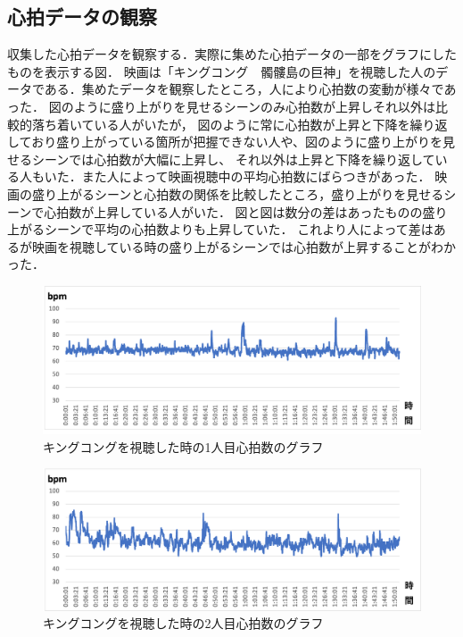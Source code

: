 \subsection{心拍データの観察}

収集した心拍データを観察する．実際に集めた心拍データの一部をグラフにしたものを表示する図．
映画は「キングコング　髑髏島の巨神」を視聴した人のデータである．集めたデータを観察したところ，人により心拍数の変動が様々であった．
図のように盛り上がりを見せるシーンのみ心拍数が上昇しそれ以外は比較的落ち着いている人がいたが，
図のように常に心拍数が上昇と下降を繰り返しており盛り上がっている箇所が把握できない人や、図のように盛り上がりを見せるシーンでは心拍数が大幅に上昇し、
それ以外は上昇と下降を繰り返している人もいた．また人によって映画視聴中の平均心拍数にばらつきがあった．
映画の盛り上がるシーンと心拍数の関係を比較したところ，盛り上がりを見せるシーンで心拍数が上昇している人がいた．
図と図は数分の差はあったものの盛り上がるシーンで平均の心拍数よりも上昇していた．
これより人によって差はあるが映画を視聴している時の盛り上がるシーンでは心拍数が上昇することがわかった．

\begin{figure}[H]
    \centering
    \includegraphics[width=14cm]{images/chapter3/gurafu2.png}
    \caption{キングコングを視聴した時の1人目心拍数のグラフ}
\end{figure}

\begin{figure}[H]
    \centering
    \includegraphics[width=14cm]{images/chapter3/gurafu.png}
    \caption{キングコングを視聴した時の2人目心拍数のグラフ}
\end{figure}

